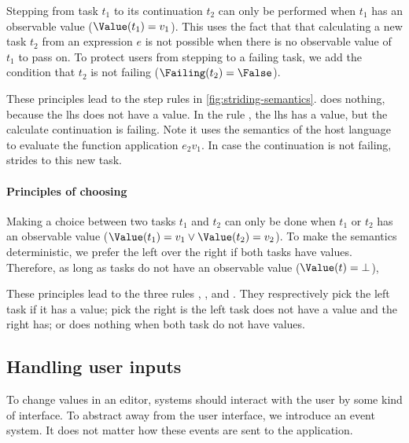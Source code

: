 Stepping from task $t_1$ to its continuation $t_2$ can only be performed when
$t_1$ has an observable value ($\Value(t_1) = v_1$).
This uses the fact that that calculating a new task $t_2$ from an expression $e$
is not possible when there is no observable value of $t_1$ to pass on.
To protect users from stepping to a failing task,
we add the condition that $t_2$ is not failing ($\Failing(t_2) = \False$).

These principles lead to the step rules in \cref{fig:striding-semantics}.
 does nothing,
because the lhs does not have a value.
In the rule ,
the lhs has a value, but the calculate continuation is failing.
Note it uses the semantics of the host language to evaluate the function application $e_2 v_1$.
In case the continuation is not failing,
 strides to this new task.



\paragraph{Principles of choosing}
\label{sub:choosing-principles}

Making a choice between two tasks $t_1$ and $t_2$ can only be done when
$t_1$ or $t_2$ has an observable value ($\Value(t_1) = v_1 \lor \Value(t_2) = v_2$).
To make the semantics deterministic,
we prefer the left over the right if both tasks have values.
Therefore, as long as tasks do not have an observable value ($\Value(t) = \bot$),

These principles lead to the three rules , , and .
They resprectively pick the left task if it has a value;
pick the right is the left task does not have a value and the right has;
or does nothing when both task do not have values.



\subsection{Handling user inputs}
\label{sec:handling}

To change values in an editor,
systems should interact with the user by some kind of interface.
To abstract away from the user interface,
we introduce an event system.
It does not matter how these events are sent to the application.

